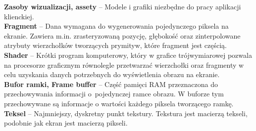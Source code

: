 \textbf{Zasoby wizualizacji, assety} -- Modele i grafiki niezbędne do pracy aplikacji klienckiej.\\

\textbf{Fragment} -- Dana wymagana do wygenerowania pojedynczego piksela na ekranie. Zawiera m.in. zrasteryzowaną pozycję, głębokość oraz zinterpolowane atrybuty wierzchołków tworzących prymityw, które fragment jest częścią.\\

\textbf{Shader} -- Krótki program komputerowy, który w grafice trójwymiarowej pozwala na procesorze graficznym równolegle przetwarzać wierzchołki oraz fragmenty w celu uzyskania danych potrzebnych do wyświetlenia obrazu na ekranie.\\

\textbf{Bufor ramki, Frame buffer} -- Część pamięci RAM przeznaczona do przechowywania informacji o~pojedynczej ramce obrazu. W buforze tym przechowywane są informacje o wartości każdego piksela tworzącego ramkę. \\

\textbf{Teksel} -- Najmniejszy, dyskretny punkt tekstury. Tekstura jest macierzą tekseli, podobnie jak ekran jest macierzą pikseli.\\

